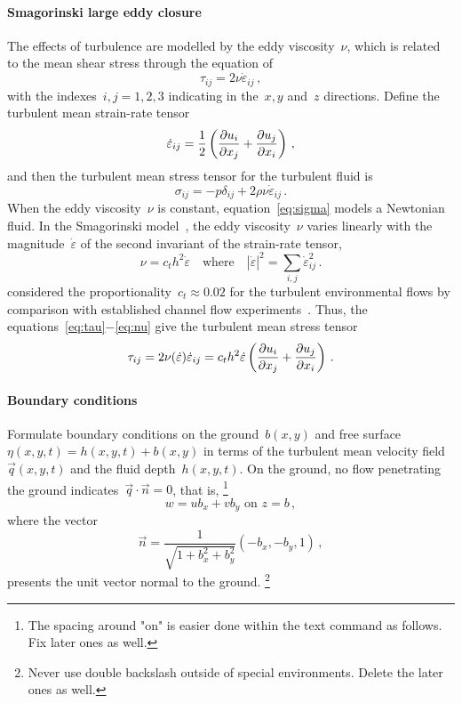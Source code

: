 \documentclass[12pt,a5paper]{article}
\newcommand{\ros}{{\dot\varepsilon}}
\begin{document}
\paragraph{Smagorinski large eddy closure} The effects of turbulence are modelled by the eddy viscosity~$\nu$, which is related to the mean shear stress through the equation of
\begin{equation}
\tau_{ij}=2\nu\ros_{ij}\,,\label{eq:tau}
\end{equation}
with the indexes~$i,j=1,2,3$ indicating in the~$x, y$ and~$z$ directions.
Define the turbulent mean strain-rate tensor~\cite[e.g.]{Roberts2008,Georgiev2008}
\begin{equation}
	\ros_{ij} =\frac12\left( \D{x_j}{u_i} +\D{x_i}{u_j}\right) \,,\label{eq:strainrate}
\end{equation}
and then the turbulent mean stress tensor for the turbulent fluid is
\begin{equation}
\sigma_{ij}=-p\delta_{ij}+2\rho\nu\ros_{ij}\,.\label{eq:sigma}
\end{equation}
When the eddy viscosity~$\nu$ is constant, equation~\eqref{eq:sigma} models a Newtonian fluid.
In the Smagorinski model~\cite[e.g.]{Ozgokmen2007a}, the eddy viscosity~$\nu$ varies linearly with the magnitude~$\ros$ of the second invariant of the strain-rate tensor,
\begin{equation}
  \nu=c_th^2\ros\quad\text{where}\quad |\ros|^2=\sum_{i,j}\ros_{ij}^2\,.\label{eq:nu}
\end{equation}
\cite{Roberts2008} considered the proportionality~$c_t\approx0.02$ for the turbulent environmental flows by comparison with established channel flow experiments~\cite[e.g.]{Nezu2005}.
Thus, the equations~\eqref{eq:tau}$-$\eqref{eq:nu} give the turbulent mean stress tensor
\begin{equation}
\tau_{ij}=2\nu(\ros)\ros_{ij}=c_th^2\ros\left( \D{x_j}{u_i} +\D{x_i}{u_j}\right) \,.\label{eq:stress}
\end{equation}

\paragraph{Boundary conditions} Formulate boundary conditions on the ground~$b(x,y)$ and free surface~$\eta(x,y,t)=h(x,y,t)+b(x,y)$ in terms of the turbulent mean velocity field~$\vec q(x,y,t)$ and the fluid depth~$h(x,y,t)$. On the ground, no flow penetrating the ground indicates~$\vec q\cdot\vec n=0$, that is,
\footnote{The spacing around "on" is easier done within the text command as follows.  Fix later ones as well.}
\begin{equation}
w=ub_x+vb_y \text{ on } z=b\,,
\label{eq:nopen}
\end{equation}
where the vector
\begin{equation}
\vec n=\frac{1}{\sqrt{1+b_x^2+b_y^2}}(-b_x,-b_y,1)\,,\label{eq:vecn}
\end{equation} 
presents the unit vector normal to the ground.  
\footnote{Never use double backslash outside of special environments.  Delete the later ones as well.}
\end{document}
